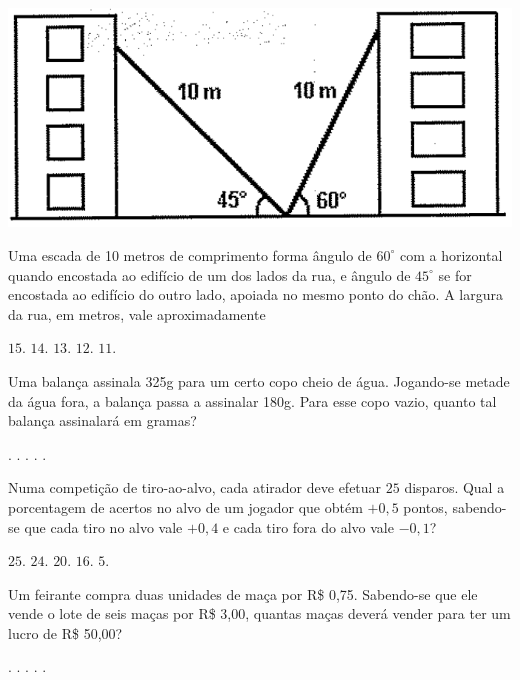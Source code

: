 \begin{question}%

    \includegraphics[width=.3\textwidth]{CONCURSO/EAM/IMAGES/2005/EAM200504IMG.png}

Uma escada de 10 metros de comprimento forma ângulo de \(60^\circ\) com a horizontal quando encostada ao edifício de um dos lados da rua, e ângulo de \(45^\circ\) se for encostada ao edifício do outro lado, apoiada no mesmo ponto do chão. A largura da rua, em metros, vale aproximadamente
    \begin{tasks}
        \task \(15\).
        \task \(14\).
        \task \(13\).
        \task \(12\).
        \task \(11\).
    \end{tasks}
\end{question}

\begin{question}%
Uma balança assinala 325g para um certo copo cheio de água. Jogando-se metade da água fora, a balança passa a assinalar 180g. Para esse copo vazio, quanto tal balança assinalará em gramas?
    \begin{tasks}
        .
        .
        .
        .
        .
    \end{tasks}
\end{question}

\begin{question}%
Numa competição de tiro-ao-alvo, cada atirador deve efetuar \(25\) disparos. Qual a porcentagem de acertos no alvo de um jogador que obtém \(+0,5\) pontos, sabendo-se que cada tiro no alvo vale \(+0,4\) e cada tiro fora do alvo vale \(-0,1\)?
    \begin{tasks}
        \task \(25\).
        \task \(24\).
        \task \(20\).
        \task \(16\).
        \task \(5\).
    \end{tasks}
\end{question}

\begin{question}%
Um feirante compra duas unidades de maça por R\$ 0,75. Sabendo-se que ele vende o lote de seis maças por R\$ 3,00, quantas maças deverá vender para ter um lucro de R\$ 50,00?
    \begin{tasks}
        .
        .
        .
        .
        .
    \end{tasks}
\end{question}

